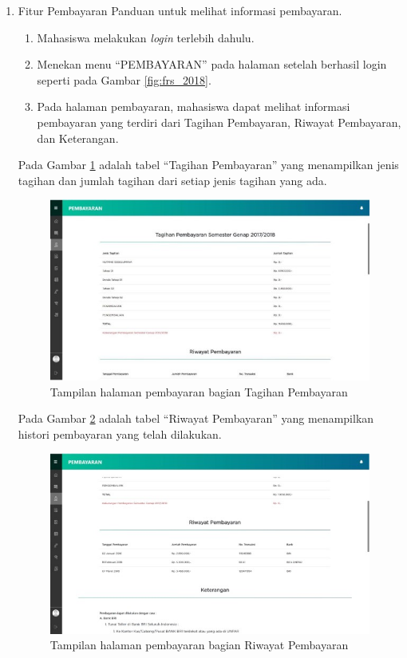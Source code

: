 \begin{enumerate}
	\item Fitur Pembayaran
	Panduan untuk melihat informasi pembayaran.
	\begin{enumerate}
		\item Mahasiswa melakukan \textit{login} terlebih dahulu. 
		\item Menekan menu ``PEMBAYARAN'' pada halaman setelah berhasil login seperti pada Gambar \ref{fig:frs_2018}. 
		\item Pada halaman pembayaran, mahasiswa dapat melihat informasi pembayaran yang terdiri dari Tagihan Pembayaran, Riwayat Pembayaran, dan Keterangan.
	\end{enumerate}
	Pada Gambar \ref{fig:bayar_2018} adalah tabel ``Tagihan Pembayaran'' yang menampilkan jenis tagihan dan jumlah tagihan dari setiap jenis tagihan yang ada.
	\begin{figure}[H]
		\centering
		\includegraphics[scale=0.7]{Gambar/bayar2018.jpg}
		\caption{Tampilan halaman pembayaran bagian Tagihan Pembayaran} 
		\label{fig:bayar_2018}
	\end{figure}
	
	Pada Gambar \ref{fig:riw_2018} adalah tabel ``Riwayat Pembayaran'' yang menampilkan histori pembayaran yang telah dilakukan.
	\begin{figure}[H]
		\centering
		\includegraphics[scale=0.7]{Gambar/riwayat2018.jpg}
		\caption{Tampilan halaman pembayaran bagian Riwayat Pembayaran} 
		\label{fig:riw_2018}
	\end{figure}
	

\end{enumerate}
